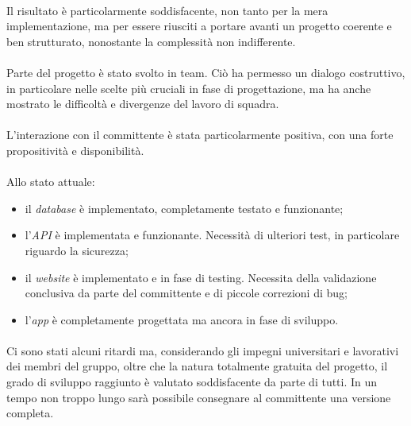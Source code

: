 \documentclass[11pt,a4paper,english]{article}
\begin{document}
\paragraph{} Il risultato è particolarmente soddisfacente, non tanto per la mera implementazione, ma per essere riusciti a portare avanti un progetto coerente e ben strutturato, nonostante la complessità non indifferente. 

\paragraph{} Parte del progetto è stato svolto in team. Ciò ha permesso un dialogo costruttivo, in particolare nelle scelte più cruciali in fase di progettazione, ma ha anche mostrato le difficoltà e divergenze del lavoro di squadra. 

\paragraph{} L'interazione con il committente è stata particolarmente positiva, con una forte propositività e disponibilità. 

\paragraph{} Allo stato attuale:
\begin{itemize}
    \item il \emph{database} è implementato, completamente testato e funzionante;
    \item l'\emph{API} è implementata e funzionante. Necessità di ulteriori test, in particolare riguardo la sicurezza;
    \item il \emph{website} è implementato e in fase di testing. Necessita della validazione conclusiva da parte del committente e di piccole correzioni di bug;  
    \item l'\emph{app} è completamente progettata ma ancora in fase di sviluppo. 
\end{itemize}

\paragraph{} Ci sono stati alcuni ritardi ma, considerando gli impegni universitari e lavorativi dei membri del gruppo, oltre che la natura totalmente gratuita del progetto, il grado di sviluppo raggiunto è valutato soddisfacente da parte di tutti. In un tempo non troppo lungo sarà possibile consegnare al committente una versione completa. 
\end{document}

